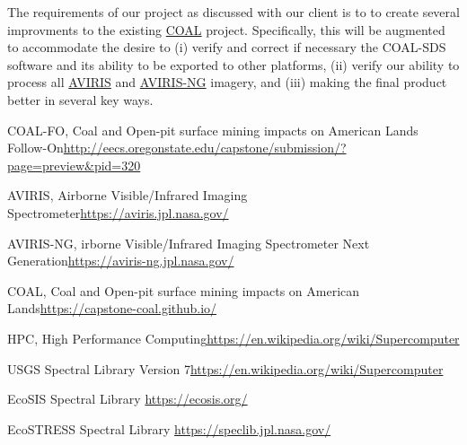\documentclass[a4paper,12pt]{article}
\begin{document}
\newline


\noindent  The requirements of our project as discussed with our client is to to create several improvments to the existing \href{https://capstone-coal.github.io/}{COAL} project. Specifically, this will be augmented to accommodate the desire to (i) verify and correct if necessary the COAL-SDS software and its ability to be exported to other platforms, (ii) verify our ability to process all \href{https://aviris.jpl.nasa.gov/}{AVIRIS} and \href{https://aviris-ng.jpl.nasa.gov/}{AVIRIS-NG} imagery, and (iii) making the final product better in several key ways.\newline

\newline

\noindent [1] COAL-FO, Coal and Open-pit surface mining impacts on American Lands Follow-On\newline \url{http://eecs.oregonstate.edu/capstone/submission/?page=preview\&pid=320} \newline

\noindent [2] AVIRIS, Airborne Visible/Infrared Imaging Spectrometer\newline \url{https://aviris.jpl.nasa.gov/} \newline

\noindent [3] AVIRIS-NG, irborne Visible/Infrared Imaging Spectrometer Next Generation\newline \url{https://aviris-ng.jpl.nasa.gov/}\newline

\noindent [4] COAL, Coal and Open-pit surface mining impacts on American Lands\newline \url{https://capstone-coal.github.io/} \newline

\noindent [5] HPC, High Performance Computing\newline \url{https://en.wikipedia.org/wiki/Supercomputer}\newline

\noindent [6] USGS Spectral Library Version 7\newline \url{https://en.wikipedia.org/wiki/Supercomputer}\newline

\noindent [7] EcoSIS Spectral Library \newline \url{https://ecosis.org/}\newline

\noindent [8] EcoSTRESS Spectral Library \newline \url{https://speclib.jpl.nasa.gov/}\newline
\end{document}
